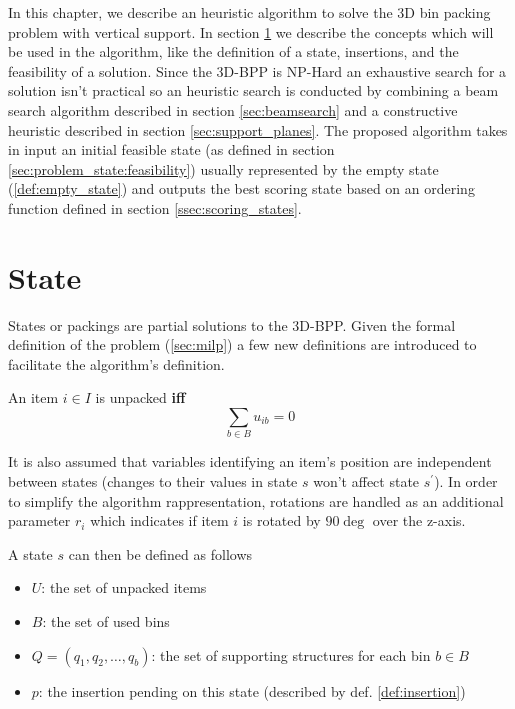 In this chapter, we describe an heuristic algorithm to solve the 3D bin packing problem with vertical support.
In section \ref{sec:problem_state} we describe the concepts which will be used in the algorithm, like the definition of a state, insertions, and the feasibility of a solution.
Since the 3D-BPP is NP-Hard an exhaustive search for a solution isn't practical so an heuristic search is conducted by combining a beam search algorithm described in section \ref{sec:beamsearch} and a constructive heuristic described in section \ref{sec:support_planes}.
The proposed algorithm takes in input an initial feasible state (as defined in section \ref{sec:problem_state:feasibility}) usually represented by the empty state (\ref{def:empty_state}) and outputs the best scoring state based on an ordering function defined in section \ref{ssec:scoring_states}.

\section{State}
\label{sec:problem_state}%
States or packings are partial solutions to the 3D-BPP. Given the formal definition of the problem (\ref{sec:milp}) a few new definitions are introduced to facilitate the algorithm's definition.
\begin{definition}
    An item $i \in I$ is unpacked \textbf{iff}
    \begin{equation*}
        \sum_{b \in B} u_{ib} = 0
    \end{equation*}
\end{definition}

It is also assumed that variables identifying an item's position are independent between states (changes to their values in state $s$ won't affect state $s^\prime$). In order to simplify the algorithm rappresentation, rotations are handled as an additional parameter $r_i$ which indicates if item $i$ is rotated by $90\deg$ over the z-axis.

A state $s$ can then be defined as follows
\begin{itemize}
    \item $U$: the set of unpacked items
    \item $B$: the set of used bins
    \item $Q = (q_1, q_2,\dots, q_b)$: the set of supporting structures for each bin $b \in B$
    \item $p$: the insertion pending on this state (described by def. \ref{def:insertion})
\end{itemize}


